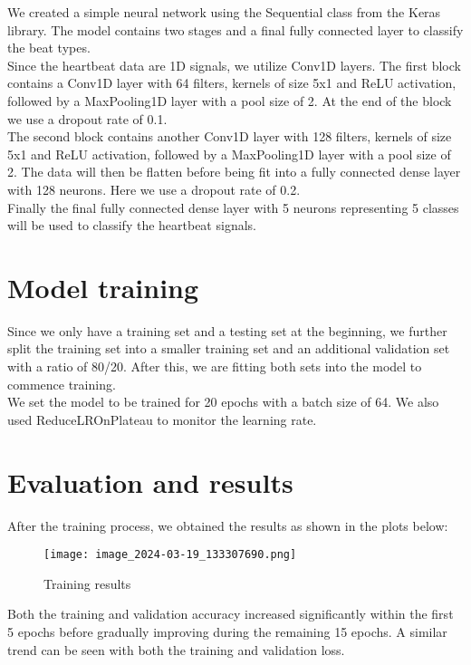 \documentclass{report}
\begin{document}
We created a simple neural network using the Sequential class from the Keras library. The model contains two stages and a final fully connected layer to classify the beat types.\\

Since the heartbeat data are 1D signals, we utilize Conv1D layers. The first block contains a Conv1D layer with 64 filters, kernels of size 5x1 and ReLU activation, followed by a MaxPooling1D layer with a pool size of 2. At the end of the block we use a dropout rate of 0.1.\\

The second block contains another Conv1D layer with 128 filters, kernels of size 5x1 and ReLU activation, followed by a MaxPooling1D layer with a pool size of 2. The data will then be flatten before being fit into a fully connected dense layer with 128 neurons. Here we use a dropout rate of 0.2.\\

Finally the final fully connected dense layer with 5 neurons representing 5 classes will be used to classify the heartbeat signals. 

\section{Model training}

Since we only have a training set and a testing set at the beginning, we further split the training set into a smaller training set and an additional validation set with a ratio of 80/20. After this, we are fitting both sets into the model to commence training.\\

We set the model to be trained for 20 epochs with a batch size of 64. We also used ReduceLROnPlateau to monitor the learning rate. 


\section{Evaluation and results}

After the training process, we obtained the results as shown in the plots below:

\begin{figure}[!h]
    \centering
    \texttt{[image: image\_2024-03-19\_133307690.png]}
    \caption{Training results}
\end{figure}

Both the training and validation accuracy increased significantly within the first 5 epochs before gradually improving during the remaining 15 epochs. A similar trend can be seen with both the training and validation loss.\\
\end{document}
